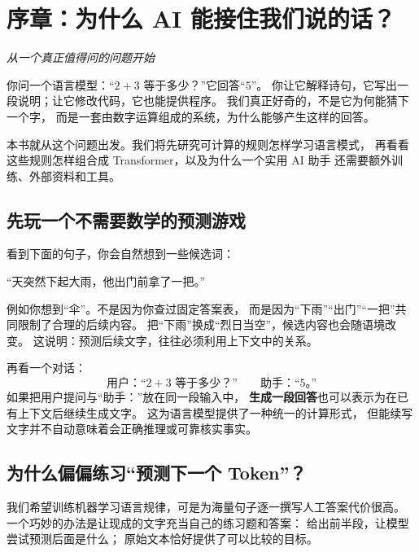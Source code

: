 \section*{序章：为什么 AI 能接住我们说的话？}
\label{front:prologue}

\begin{idea}
\noindent\emph{从一个真正值得问的问题开始}\par

你问一个语言模型：“$2+3$ 等于多少？”它回答“$5$”。
你让它解释诗句，它写出一段说明；让它修改代码，它也能提供程序。
我们真正好奇的，不是它为何能猜下一个字，
而是一套由数字运算组成的系统，为什么能够产生这样的回答。

本书就从这个问题出发。我们将先研究可计算的规则怎样学习语言模式，
再看看这些规则怎样组合成 Transformer，以及为什么一个实用 AI 助手
还需要额外训练、外部资料和工具。
\end{idea}

\subsection*{先玩一个不需要数学的预测游戏}

看到下面的句子，你会自然想到一些候选词：
\begin{center}
\begin{tcolorbox}[colback=paper,colframe=linegray,arc=2mm,boxrule=.6pt,
left=5mm,right=5mm,top=3mm,bottom=3mm]
“天突然下起大雨，他出门前拿了一把\underline{\hspace{12mm}}。”
\end{tcolorbox}
\end{center}
例如你想到“伞”。不是因为你查过固定答案表，
而是因为“下雨”“出门”“一把”共同限制了合理的后续内容。
把“下雨”换成“烈日当空”，候选内容也会随语境改变。
这说明：预测后续文字，往往必须利用上下文中的关系。

再看一个对话：
\[
\text{用户：“$2+3$ 等于多少？”}\qquad
\text{助手：“$5$。”}
\]
如果把用户提问与“助手：”放在同一段输入中，
\textbf{生成一段回答}也可以表示为在已有上下文后继续生成文字。
这为语言模型提供了一种统一的计算形式，
但能续写文字并不自动意味着会正确推理或可靠核实事实。

\subsection*{为什么偏偏练习“预测下一个 Token”？}

我们希望训练机器学习语言规律，可是为海量句子逐一撰写人工答案代价很高。
一个巧妙的办法是让现成的文字充当自己的练习题和答案：
给出前半段，让模型尝试预测后面是什么；
原始文本恰好提供了可以比较的目标。


